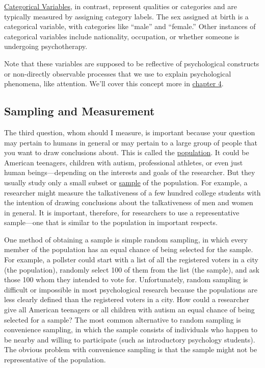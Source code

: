 \documentclass[
]{krantz}
\begin{document}
\hyperref[categorical-variables]{Categorical Variables}, in contrast, represent qualities or categories and are typically measured by assigning category labels. The sex assigned at birth is a categorical variable, with categories like ``male'' and ``female.'' Other instances of categorical variables include nationality, occupation, or whether someone is undergoing psychotherapy.

Note that these variables are supposed to be reflective of psychological constructs or non-directly observable processes that we use to explain psychological phenomena, like attention. We'll cover this concept more in \hyperref[psychological-constructs]{chapter 4}.

\subsection*{Sampling and Measurement}\label{sampling-and-measurement}


The third question, whom should I measure, is important because your question may pertain to humans in general or may pertain to a large group of people that you want to draw conclusions about. This is called the \hyperref[population]{population}. It could be American teenagers, children with autism, professional athletes, or even just human beings---depending on the interests and goals of the researcher. But they usually study only a small subset or \hyperref[sample]{sample} of the population. For example, a researcher might measure the talkativeness of a few hundred college students with the intention of drawing conclusions about the talkativeness of men and women in general. It is important, therefore, for researchers to use a representative sample---one that is similar to the population in important respects.

One method of obtaining a sample is simple random sampling, in which every member of the population has an equal chance of being selected for the sample. For example, a pollster could start with a list of all the registered voters in a city (the population), randomly select 100 of them from the list (the sample), and ask those 100 whom they intended to vote for. Unfortunately, random sampling is difficult or impossible in most psychological research because the populations are less clearly defined than the registered voters in a city. How could a researcher give all American teenagers or all children with autism an equal chance of being selected for a sample? The most common alternative to random sampling is convenience sampling, in which the sample consists of individuals who happen to be nearby and willing to participate (such as introductory psychology students). The obvious problem with convenience sampling is that the sample might not be representative of the population.
\end{document}
